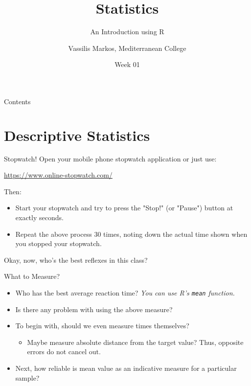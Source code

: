 \documentclass[aspectratio=169, 12pt, xcolor=table]{beamer}
\title{Statistics}
\subtitle{An Introduction using R}
\date{Week 01}
\author{Vassilis Markos, Mediterranean College}
\def\sms#1{\smsgo#1\relax}
\def\smsgo#1.#2\relax{#1.{\scriptsize #2}}
\begin{document}
	\begin{frame}
		\titlepage
	\end{frame}

	\begin{frame}{Contents}
		\tableofcontents
	\end{frame}

	\section{Descriptive Statistics}\label{sec:descriptive-statistics}
	
	\sectionframe
	
	\begin{frame}{Stopwatch!}
		Open your mobile phone stopwatch application or just use:
		\begin{center}
			\url{https://www.online-stopwatch.com/}
		\end{center}
		Then:
		\begin{itemize}
			\item Start your stopwatch and try to press the "Stop!" (or "Pause") button at exactly \sms{3.000} seconds.
			\item Repeat the above process 30 times, noting down the actual time shown when you stopped your stopwatch.
		\end{itemize}
		Okay, now, who's the best reflexes in this class?
	\end{frame}
	
	\begin{frame}{What to Measure?}
		\begin{itemize}
			\item Who has the best average reaction time? \textit{You can use R's \texttt{mean} function.}\pause
			\item Is there any problem with using the above measure?\pause
			\item To begin with, should we even measure times themselves?\pause
			\begin{itemize}
				\item Maybe measure absolute distance from the target value? Thus, opposite errors do not cancel out.\pause
			\end{itemize}
			\item Next, how reliable is mean value as an indicative measure for a particular sample?
		\end{itemize}
	\end{frame}
\end{document}
